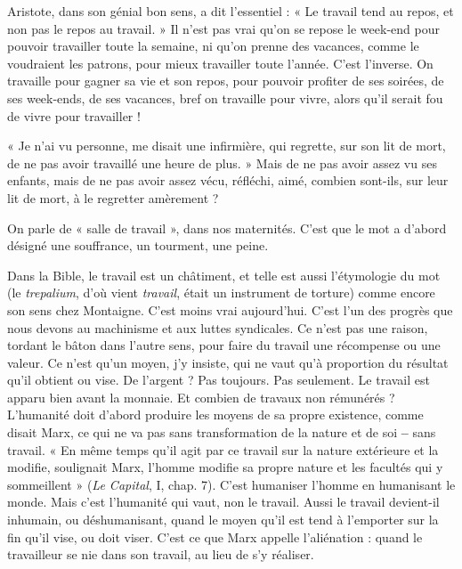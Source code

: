 Aristote, dans son génial bon sens, a dit l’essentiel : « Le travail tend au
repos, et non pas le repos au travail. » Il n’est pas vrai qu’on se repose le week-end
pour pouvoir travailler toute la semaine, ni qu’on prenne des vacances,
comme le voudraient les patrons, pour mieux travailler toute l’année. C’est
l'inverse. On travaille pour gagner sa vie et son repos, pour pouvoir profiter de
ses soirées, de ses week-ends, de ses vacances, bref on travaille pour vivre, alors
qu’il serait fou de vivre pour travailler !

« Je n’ai vu personne, me disait une infirmière, qui regrette, sur son lit de
mort, de ne pas avoir travaillé une heure de plus. » Mais de ne pas avoir assez
vu ses enfants, mais de ne pas avoir assez vécu, réfléchi, aimé, combien sont-ils,
sur leur lit de mort, à le regretter amèrement ?

On parle de « salle de travail », dans nos maternités. C’est que le mot a
d’abord désigné une souffrance, un tourment, une peine.

Dans la Bible, le travail est un châtiment, et telle est aussi l’étymologie du
mot (le {\it trepalium}, d’où vient {\it travail}, était un instrument de torture) comme
encore son sens chez Montaigne. C’est moins vrai aujourd’hui. C’est l’un des
progrès que nous devons au machinisme et aux luttes syndicales. Ce n’est pas
une raison, tordant le bâton dans l’autre sens, pour faire du travail une récompense
ou une valeur. Ce n’est qu’un moyen, j'y insiste, qui ne vaut qu’à proportion
du résultat qu’il obtient ou vise. De l’argent ? Pas toujours. Pas seulement.
Le travail est apparu bien avant la monnaie. Et combien de travaux non
rémunérés ? L’humanité doit d’abord produire les moyens de sa propre existence,
comme disait Marx, ce qui ne va pas sans transformation de la nature et
de soi {\bf --} sans travail. « En même temps qu'il agit par ce travail sur la nature extérieure
et la modifie, soulignait Marx, l’homme modifie sa propre nature et les
facultés qui y sommeillent » ({\it Le Capital}, I, chap. 7). C’est humaniser l’homme en
humanisant le monde. Mais c’est l'humanité qui vaut, non le travail. Aussi le travail
devient-il inhumain, ou déshumanisant, quand le moyen qu’il est tend à
l'emporter sur la fin qu’il vise, ou doit viser. C’est ce que Marx appelle
l'aliénation : quand le travailleur se nie dans son travail, au lieu de s’y réaliser.

